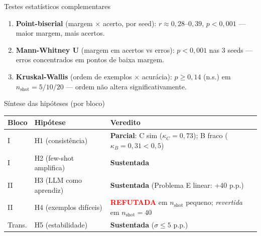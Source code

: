 \documentclass[aspectratio=169,10pt]{beamer}
\begin{document}
\begin{frame}{Testes estat\'isticos complementares}
  \footnotesize
  \begin{enumerate}
    \item \textbf{Point-biserial} (margem $\times$ acerto, por seed): $r \approx 0{,}28$--$0{,}39$, $p<0{,}001$ --- maior margem, mais acertos.
    \item \textbf{Mann-Whitney U} (margem em acertos vs erros): $p<0{,}001$ nas 3 seeds --- erros concentrados em pontos de baixa margem.
    \item \textbf{Kruskal-Wallis} (ordem de exemplos $\times$ acur\'acia): $p \geq 0{,}14$ (n.s.) em $n_{\text{shot}}=5/10/20$ --- ordem n\~ao altera significativamente.
  \end{enumerate}
\end{frame}

\begin{frame}{S\'intese das hip\'oteses (por bloco)}
  \footnotesize
  \begin{center}
  \begin{tabular}{llp{5cm}}
    \toprule
    Bloco & Hip\'otese & Veredito \\
    \midrule
    I  & H1 (consist\^encia)            & \textbf{Parcial}: C sim ($\kappa_C{=}0{,}73$); B fraco ($\kappa_B{=}0{,}31 < 0{,}5$) \\
    I  & H2 (few-shot amplifica)        & \textbf{Sustentada} \\
    II & H3 (LLM como aprendiz)         & \textbf{Sustentada} (Problema E linear: +40 p.p.) \\
    II & H4 (exemplos dif\'iceis)        & \textcolor{red}{\textbf{REFUTADA}} em $n_{\text{shot}}$ pequeno; \emph{revertida} em $n_{\text{shot}}=40$ \\
    Trans. & H5 (estabilidade)         & \textbf{Sustentada} ($\sigma \leq 5$ p.p.) \\
    \bottomrule
  \end{tabular}
  \end{center}
\end{frame}
\end{document}
